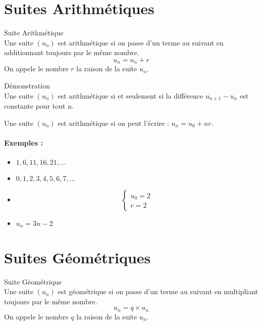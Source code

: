 \documentclass[11pt]{article}%
\begin{document}
\begin{multicols}{2}
\section{Suites Arithmétiques}

\begin{Definition}{Suite Arithmétique}\\
  Une suite $(u_n)$ est arithmétique si on passe d'un terme au suivant en additionnant toujours par le même nombre.
  $$u_n = u_n + r$$
  On appele le nombre $r$ la raison de la suite $u_n$.
\end{Definition}

\begin{Proposition}{Démonstration}\\
 Une suite $(u_n)$ est arithmétique si et seulement si la différence $u_{n+1} - u_n$ est constante pour tout n.
\end{Proposition}

\begin{Proposition}{}
  Une suite $(u_n)$ est arithmétique si on peut l'écrire : $u_{n} = u_0 + nr$.
\end{Proposition}

\paragraph{Exemples : }
\begin{itemize}
\item $1, 6, 11, 16, 21, ... $
\item $0, 1, 2, 3, 4, 5, 6, 7, ...$
\item 
\begin{equation*}
  \left\lbrace
  \begin{array}{ccc}
    u_0 = 2\\
    r = 2
  \end{array}\right.
\end{equation*}

\item $u_n  = 3n - 2$
\end{itemize}

\section{Suites Géométriques}

\begin{Definition}{Suite Géométrique}\\
  Une suite $(u_n)$ est géométrique si on passe d'un terme au suivant en multipliant toujours par le même nombre.
  $$u_n = q \times u_n$$
  On appele le nombre $q$ la raison de la suite $u_n$.
\end{Definition}


\end{multicols}
\end{document}
